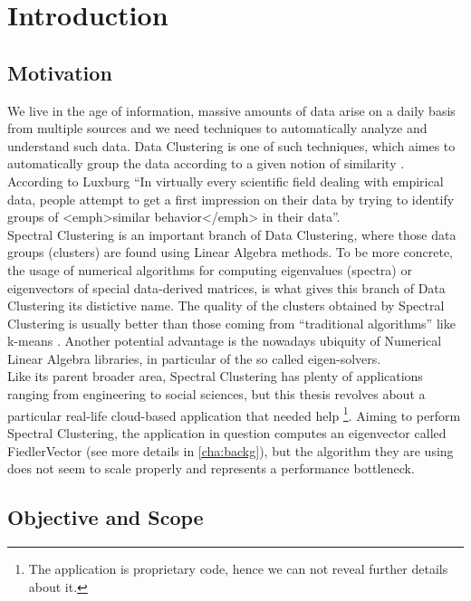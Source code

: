 \chapter{Introduction}

\section{Motivation}

We live in the age of information, massive amounts of data arise on a
daily basis from multiple sources and we need techniques to
automatically analyze and understand such data. Data Clustering is one
of such techniques, which aimes to automatically group the data
according to a given notion of similarity \cite{pang06}. According to
Luxburg \cite{luxburg07} ``In virtually every  
scientific field dealing with empirical data, people attempt to get a
first impression on their data by
trying to identify groups of <emph>similar behavior</emph> in their
data''. \\

Spectral Clustering is an important branch of Data Clustering, where
those data groups (clusters) are found using Linear Algebra
methods. To be more concrete, the usage of numerical algorithms for computing
eigenvalues (spectra) or eigenvectors of special data-derived
matrices, is what gives this branch of Data Clustering its distictive 
name. The quality of the clusters obtained by Spectral Clustering 
is usually better than those coming from ``traditional algorithms''
like k-means \cite{luxburg07}. Another potential advantage is the
nowadays ubiquity of Numerical Linear Algebra libraries, in particular
of the so called eigen-solvers. \\

Like its parent broader area, Spectral Clustering has plenty of
applications ranging from engineering to social sciences, but this
thesis revolves about a particular real-life cloud-based application
that needed help \footnote{The application is proprietary code, hence
  we can not 
  reveal further details about it.}. Aiming to perform Spectral
Clustering, the application in question
computes an eigenvector called \gls{FiedlerVector} (see more
details in \cref{cha:backg}), but the algorithm they are using does
not seem to scale properly and represents a performance bottleneck. 

\section{Objective and Scope}

